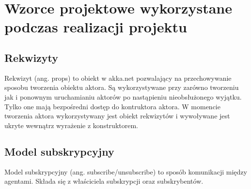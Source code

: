 \chapter{Wzorce projektowe wykorzystane podczas realizacji projektu}
\section{Rekwizyty}
Rekwizyt (ang. props) to obiekt w akka.net pozwalający na przechowywanie sposobu tworzenia obiektu aktora. 
Są wykorzystywane przy zarówno tworzeniu jak i ponownym uruchamianiu aktorów po nastąpieniu nieobsłużonego wyjątku.
Tylko one mają bezpośredni dostęp do kontruktora aktora. W momencie tworzenia aktora wykorzystywany jest obiekt rekwizytów i wywoływane jest ukryte wewnątrz wyrażenie z konstruktorem.

\section{Model subskrypcyjny}
Model subskrypcyjny (ang. subscribe/unsubscribe) to sposób komunikacji między agentami. Składa się z właściciela subskrypcji oraz subskrybentów. 
